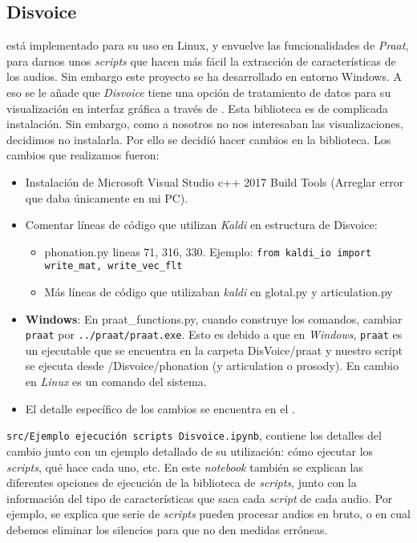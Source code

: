 \subsection{Disvoice}
 está implementado para su uso en Linux, y envuelve las funcionalidades de \textit{Praat}, para darnos unos \textit{scripts} que hacen más fácil la extracción de características de los audios. Sin embargo este proyecto se ha desarrollado en entorno Windows. A eso se le añade que \textit{Disvoice} tiene una opción de tratamiento de datos para su visualización en interfaz gráfica a través de . Esta biblioteca es de complicada instalación. Sin embargo, como a nosotros no nos interesaban las visualizaciones, decidimos no instalarla. Por ello se decidió hacer cambios en la biblioteca. Los cambios que realizamos fueron:
\begin{itemize}
\item Instalación de Microsoft Visual Studio c++ 2017 Build Tools (Arreglar error que daba únicamente en mi PC).
\item Comentar líneas de código que utilizan \textit{Kaldi} en estructura de Disvoice:
	\begin{itemize}
    \item phonation.py lineas 71, 316, 330. Ejemplo: \texttt{from kaldi\_io import write\_mat, write\_vec\_flt}
   	\item Más líneas de código que utilizaban \textit{kaldi} en glotal.py y articulation.py
   	\end{itemize}
\item \textbf{Windows}: En praat\_functions.py, cuando construye los comandos, cambiar \texttt{praat} por \texttt{../praat/praat.exe}. Esto es debido a que en \textit{Windows}, \texttt{praat} es un ejecutable que se encuentra en la carpeta DisVoice/praat y nuestro script se ejecuta desde /Disvoice/phonation (y articulation o prosody). En cambio en \textit{Linux} es un comando del sistema.
\item El detalle específico de los cambios se encuentra en el . 
\end{itemize}

\begin{tcolorbox}
\texttt{src/Ejemplo ejecución scripts Disvoice.ipynb}, contiene los detalles del cambio junto con un ejemplo detallado de su utilización: cómo ejecutar los \textit{scripts}, qué hace cada uno, etc. En este \textit{notebook} también se explican las diferentes opciones de ejecución de la biblioteca de \textit{scripts}, junto con la información del tipo de características que saca cada \textit{script} de cada audio. Por ejemplo, se explica que serie de \textit{scripts} pueden procesar audios en bruto, o en cual debemos eliminar los silencios para que no den medidas erróneas.
\end{tcolorbox}

